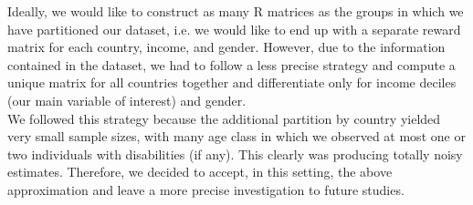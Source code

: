 Ideally, we would like to construct as many R matrices as the groups in which we have partitioned our dataset, i.e. we would like to end up with a separate reward matrix for each country, income, and gender.
However, due to the information contained in the dataset, we had to follow a less precise strategy and compute a unique matrix for all countries together and differentiate only for income deciles (our main variable of interest) and gender. \\
We followed this strategy because the additional partition by country yielded very small sample sizes, with many age class in which we observed at most one or two individuals with disabilities (if any). This clearly was producing totally noisy estimates. Therefore, we decided to accept, in this setting, the above approximation and leave a more precise investigation to future studies. 






